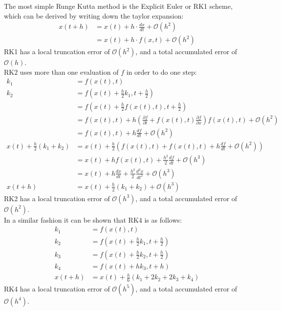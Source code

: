 The most simple Runge Kutta method is the Explicit Euler or RK1 scheme, which can be derived by writing down the taylor expansion:
\begin{align*}
x(t+h) &= x(t) + h \cdot \frac{dx}{dt} + \mathcal{O}(h ^2)\\
&= x(t) + h \cdot f(x,t) + \mathcal{O}(h ^2)
\end{align*}
RK1 has a local truncation error of $\mathcal{O}(h^2)$, and a total accumulated error of $\mathcal{O}(h)$.\\
RK2 uses more than one evaluation of $f$ in order to do one step:
\begin{align*}
k_1 &= f(x(t),t)\\
k_2 &= f(x(t) + \frac{h}{2} k_1, t + \frac{h}{2})\\
&= f(x(t) + \frac{h}{2} f(x(t),t), t + \frac{h}{2})\\
&= f(x(t),t) + h\left(\frac{\partial f}{\partial t} + f(x(t),t)\frac{\partial f}{\partial x}\right)f(x(t),t) + \mathcal{O}(h^2)\\
&= f(x(t),t) + h\frac{df}{dt} + \mathcal{O}(h^2)\\
x(t) + \frac{h}{2} (k_1+k_2) &= x(t) + \frac{h}{2} \left(f(x(t),t) + f(x(t),t) + h\frac{df}{dt} + \mathcal{O}(h^2)\right)\\
&= x(t) + h f(x(t),t) + \frac{h^2}{2} \frac{df}{dt} + \mathcal{O}(h^3)\\
&= x(t) + h \frac{dx}{dt} + \frac{h^2}{2} \frac{d^2x}{dt^2} + \mathcal{O}(h^3)\\
x(t+h) &= x(t) + \frac{h}{2} (k_1+k_2) + \mathcal{O}(h^3)
\end{align*}
RK2 has a local truncation error of $\mathcal{O}(h^3)$, and a total accumulated error of $\mathcal{O}(h^2)$.\\
In a similar fashion it can be shown that RK4 is as follows:
\begin{align*}
k_1 &= f(x(t),t)\\
k_2 &= f\left(x(t)+\frac{h}{2}k_1,t+\frac{h}{2}\right)\\
k_3 &= f\left(x(t)+\frac{h}{2}k_2,t+\frac{h}{2}\right)\\
k_4 &= f(x(t) + h k_3, t + h)\\
x(t+h) &= x(t) + \frac{h}{6}(k_1+2k_2+2k_3+k_4)
\end{align*}
RK4 has a local truncation error of $\mathcal{O}(h^5)$, and a total accumulated error of $\mathcal{O}(h^4)$.\\

